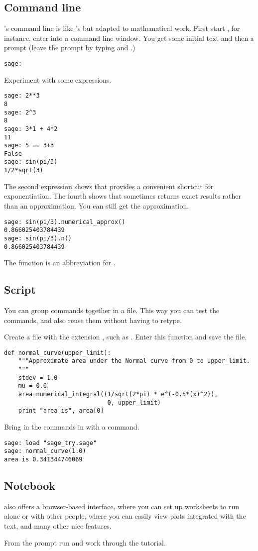 \subsection{Command line}
\Sage's command line is like \python's but adapted to 
mathematical work.
First start \Sage,
for instance, enter  into a command line window.
You get some initial text and then a prompt
(leave the prompt by typing 
and .)
\begin{lstlisting}[style=python]
sage:  
\end{lstlisting}

Experiment with some expressions.
\begin{lstlisting}[style=python]
sage: 2**3                                                                           
8
sage: 2^3
8
sage: 3*1 + 4*2
11
sage: 5 == 3+3
False
sage: sin(pi/3)
1/2*sqrt(3)
\end{lstlisting}
The second expression 
shows that \Sage{} provides a convenient shortcut for exponentiation.
The fourth shows that \Sage{} sometimes returns exact results rather than an
approximation.
You can still get the approximation. 
\begin{lstlisting}[style=python]
sage: sin(pi/3).numerical_approx()
0.866025403784439
sage: sin(pi/3).n()
0.866025403784439  
\end{lstlisting}
The function  is an abbreviation for 
.


\subsection{Script}
You can group \Sage{} commands together in a file.
This way you can test the commands, 
and also reuse them without having to retype.

Create a file with the extension , such as .
Enter this function and save the file.
\begin{lstlisting}[style=python]
def normal_curve(upper_limit):
    """Approximate area under the Normal curve from 0 to upper_limit.
    """
    stdev = 1.0
    mu = 0.0
    area=numerical_integral((1/sqrt(2*pi) * e^(-0.5*(x)^2)),
                             0, upper_limit)    
    print "area is", area[0]
\end{lstlisting}
Bring in the commands in with a  command.
\begin{lstlisting}[style=python]
sage: load "sage_try.sage"
sage: normal_curve(1.0)   
area is 0.341344746069  
\end{lstlisting}


\subsection{Notebook}
\Sage{} also offers a browser-based interface, where you can set up
worksheets to run alone or with other people, where you can easily
view plots integrated with the text, and many other nice features.

From the \Sage{} prompt run  and
work through the tutorial.
\endinput


TODO:
  1) how to use notebook to do exercises?